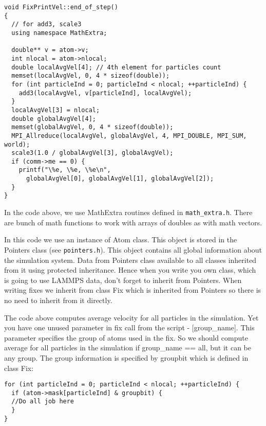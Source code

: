 \documentclass{article}
\newcommand{\path}[1]{{\color{gray}\texttt{#1}}}
\begin{document}
\begin{center}
\begin{verbatim}
void FixPrintVel::end_of_step()
{
  // for add3, scale3
  using namespace MathExtra;

  double** v = atom->v;
  int nlocal = atom->nlocal;
  double localAvgVel[4]; // 4th element for particles count
  memset(localAvgVel, 0, 4 * sizeof(double));
  for (int particleInd = 0; particleInd < nlocal; ++particleInd) {
    add3(localAvgVel, v[particleInd], localAvgVel);
  }
  localAvgVel[3] = nlocal;
  double globalAvgVel[4];
  memset(globalAvgVel, 0, 4 * sizeof(double));
  MPI_Allreduce(localAvgVel, globalAvgVel, 4, MPI_DOUBLE, MPI_SUM, world);
  scale3(1.0 / globalAvgVel[3], globalAvgVel);
  if (comm->me == 0) {
    printf("\%e, \%e, \%e\n",
      globalAvgVel[0], globalAvgVel[1], globalAvgVel[2]);
  }
}
\end{verbatim}
\end{center}

In the code above, we use MathExtra routines defined in
\path{math\_extra.h}.  There are bunch of math functions to work with
arrays of doubles as with math vectors.

In this code we use an instance of Atom class. This object is stored
in the Pointers class (see \path{pointers.h}). This object contains all
global information about the simulation system. Data from Pointers
class available to all classes inherited from it using protected
inheritance. Hence when you write you own class, which is going to use
LAMMPS data, don't forget to inherit from Pointers.  When writing
fixes we inherit from class Fix which is inherited from Pointers so
there is no need to inherit from it directly.

The code above computes average velocity for all particles in the
simulation.  Yet you have one unused parameter in fix call from the
script - [group\_name].  This parameter specifies the group of atoms
used in the fix. So we should compute average for all particles in the
simulation if group\_name == all, but it can be any group. The group
information is specified by groupbit which is defined in class Fix:

\begin{center}
\begin{verbatim}
for (int particleInd = 0; particleInd < nlocal; ++particleInd) {
  if (atom->mask[particleInd] & groupbit) {
  //Do all job here
  }
}
\end{verbatim}
\end{center}
\end{document}
